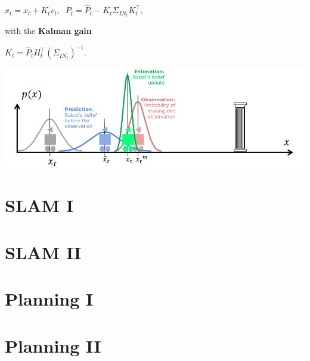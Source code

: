\documentclass[landscape]{article}
\newcommand{\vtspace}{\vspace{-10pt}}
\begin{document}
\begin{multicols}{3}
\begin{minipage}{\columnwidth}
\begin{compactenum}
    \begin{center}
      $
      x_t = \hat x_t + K_t v_t,\;\;
      P_t = \hat P_t - K_t \Sigma_{IN_t}K_t^\intercal,
      $
    \end{center}

    with the \textbf{Kalman gain}

    \begin{center}
      $
      K_t = \hat P_t H_t^\intercal (\Sigma_{IN_t})^{-1}.
      $
    \end{center}

  \end{compactenum}
  \includegraphics[width=\columnwidth]{img/9_Kalman.png}
\end{minipage}


\vfill

\section{SLAM I}

\blindtext[3]

\vfill

\section{SLAM II}

\blindtext[3]

\vfill

\section{Planning I}

\blindtext[3]

\vfill

\vtspace

\section{Planning II}


\end{multicols}
\end{document}
